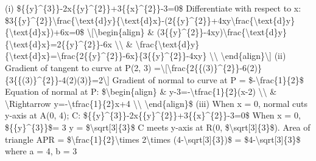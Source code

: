 \item (i) \$\{\{y\}\textasciicircum\{3\}\}-2x\{\{y\}\textasciicircum\{2\}\}+3\{\{x\}\textasciicircum\{2\}\}-3=0\$
Differentiate with respect to x: \$3\{\{y\}\textasciicircum\{2\}\}\textbackslash frac\{\textbackslash text\{d\}y\}\{\textbackslash text\{d\}x\}-(2\{\{y\}\textasciicircum\{2\}\}+4xy\textbackslash frac\{\textbackslash text\{d\}y\}\{\textbackslash text\{d\}x\})+6x=0\$
\textbackslash{[}\textbackslash begin\{align\} \& (3\{\{y\}\textasciicircum\{2\}\}-4xy)\textbackslash frac\{\textbackslash text\{d\}y\}\{\textbackslash text\{d\}x\}=2\{\{y\}\textasciicircum\{2\}\}-6x
\textbackslash\textbackslash{} \& \textbackslash frac\{\textbackslash text\{d\}y\}\{\textbackslash text\{d\}x\}=\textbackslash frac\{2\{\{y\}\textasciicircum\{2\}\}-6x\}\{3\{\{y\}\textasciicircum\{2\}\}-4xy\}
\textbackslash\textbackslash{} \textbackslash end\{align\}\textbackslash{]}
(ii) Gradient of tangent to curve at P(2, 3) =\textbackslash{[}\textbackslash frac\{2\{\{(3)\}\textasciicircum\{2\}\}-6(2)\}\{3\{\{(3)\}\textasciicircum\{2\}\}-4(2)(3)\}=2\textbackslash{]}
Gradient of normal to curve at P = \$-\textbackslash frac\{1\}\{2\}\$
Equation of normal at P: \$\textbackslash begin\{align\} \& y-3=-\textbackslash tfrac\{1\}\{2\}(x-2)
\textbackslash\textbackslash{} \& \textbackslash Rightarrow y=-\textbackslash tfrac\{1\}\{2\}x+4
\textbackslash\textbackslash{} \textbackslash end\{align\}\$ (iii)
When x = 0, normal cuts y-axis at A(0, 4); C: \$\{\{y\}\textasciicircum\{3\}\}-2x\{\{y\}\textasciicircum\{2\}\}+3\{\{x\}\textasciicircum\{2\}\}-3=0\$
When x = 0, \$\{\{y\}\textasciicircum\{3\}\}\$= 3 y = \$\textbackslash sqrt{[}3{]}\{3\}\$
C meets y-axis at R(0, \$\textbackslash sqrt{[}3{]}\{3\}\$). Area
of triangle APR = \$\textbackslash frac\{1\}\{2\}\textbackslash times
2\textbackslash times (4-\textbackslash sqrt{[}3{]}\{3\})\$ = \$4-\textbackslash sqrt{[}3{]}\{3\}\$
where a = 4, b = 3